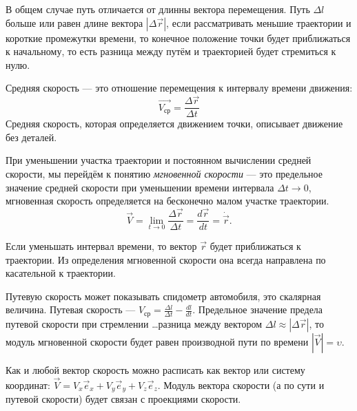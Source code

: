 В общем случае путь отличается от длинны вектора перемещения. Путь \( \Delta l
\) больше или равен длине вектора \( |\Delta \vec{r}| \), если рассматривать
меньшие траектории и короткие промежутки времени, то конечное положение точки
будет приближаться к начальному, то есть разница между путём и траекторией
будет стремиться к нулю.

Средняя скорость --- это отношение перемещения к интервалу времени движения:
\begin{equation}
  \vec{V_\text{ср}} = \frac{\Delta \vec{r}}{\Delta t}
\end{equation}
Средняя скорость, которая определяется движением точки, описывает движение без
деталей.

При уменьшении участка траектории и постоянном вычислении средней скорости, мы
перейдём к понятию \emph{мгновенной скорости} --- это предельное значение
средней скорости при уменьшении времени интервала \( \Delta t \to 0 \),
мгновенная скорость определяется на бесконечно малом участке траектории.
\[
  \vec{V} = \lim_{t \to 0} \frac{\Delta \vec{r}}{\Delta t} = \frac{d \vec{r}}{d
  t} = \dot{\vec{r}}
.\]

\begin{figure}[!htbp]
  \begin{center}
  \end{center}
\end{figure}

Если уменьшать интервал времени, то вектор \( \vec{r} \) будет приближаться к
траектории. Из определения мгновенной скорости она всегда направлена по
касательной к траектории.

Путевую скорость может показывать спидометр
автомобиля, это скалярная величина. Путевая скорость --- \( V_\text{ср} =
\frac{\Delta l}{\Delta t} - \frac{d l}{d t} \). Предельное значение предела
путевой скорости при стремлении \ldots разница между вектором \( \Delta l
\approx |\Delta \vec{r}| \), то модуль мгновенной скорости будет равен
производной пути по времени \( |\vec{V}| = \upsilon \).

Как и любой вектор скорость можно расписать как вектор или систему координат:
\( \vec{V} = V_x \vec{e}_x + V_y \vec{e}_y + V_z \vec{e}_z \). Модуль вектора
скорости (а по сути и путевой скорости) будет связан с проекциями скорости.

